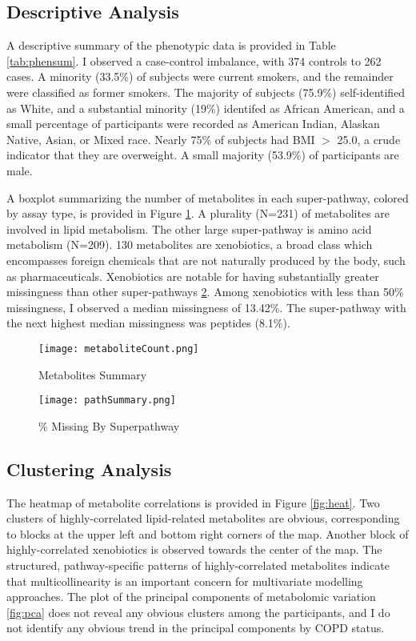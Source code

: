 \documentclass{article}
\begin{document}
\subsection*{Descriptive Analysis}
A descriptive summary of the phenotypic data is provided in Table \ref{tab:phensum}. I observed a case-control imbalance, with 374 controls to 262 cases. A minority (33.5\%) of subjects were current smokers, and the remainder were classified as former smokers. The majority of subjects (75.9\%) self-identified as White, and a substantial minority (19\%) identifed as African American, and a small percentage of participants were recorded as American Indian, Alaskan Native, Asian, or Mixed race. Nearly 75\% of subjects had BMI \(>\) 25.0, a crude indicator that they are overweight. A small majority (53.9\%) of participants are male.

A boxplot summarizing the number of metabolites in each super-pathway, colored by assay type, is provided in Figure \ref{fig:metabSum}. A plurality (N=231) of metabolites are involved in lipid metabolism. The other large super-pathway is amino acid metabolism (N=209). 130 metabolites are xenobiotics, a broad class which encompasses foreign chemicals that are not naturally produced by the body, such as pharmaceuticals. Xenobiotics are notable for having substantially greater missingness than other super-pathways \ref{fig:pathMiss}. Among xenobiotics with less than 50\% missingness, I observed a median missingness of 13.42\%. The super-pathway with the next highest median missingness was peptides (8.1\%).



\begin{figure}
  \centering
  \caption{Metabolites Summary}
  \texttt{[image: metaboliteCount.png]}
  \label{fig:metabSum}
  \end{figure}

\begin{figure}
  \centering
  \caption{\% Missing By Superpathway}
  \texttt{[image: pathSummary.png]}
  \label{fig:pathMiss}
  \end{figure}

\subsection*{Clustering Analysis}
The heatmap of metabolite correlations is provided in Figure \ref{fig:heat}. Two clusters of highly-correlated lipid-related metabolites are obvious, corresponding to blocks at the upper left and bottom right corners of the map. Another block of highly-correlated xenobiotics is observed towards the center of the map. The structured, pathway-specific patterns of highly-correlated metabolites indicate that multicollinearity is an important concern for multivariate modelling approaches. The plot of the principal components of metabolomic variation \ref{fig:pca} does not reveal any obvious clusters among the participants, and I do not identify any obvious trend in the principal components by COPD status.
\end{document}
